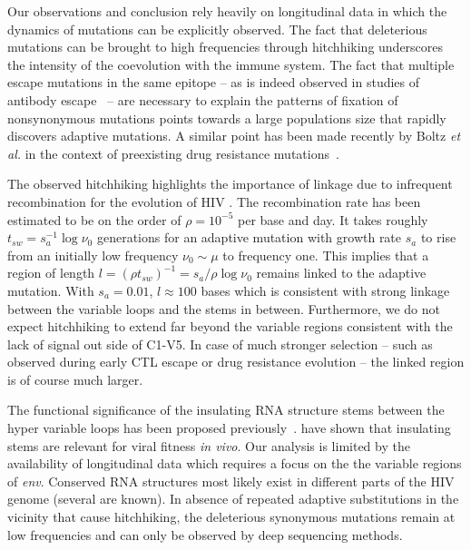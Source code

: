 \documentclass[rmp, twocolumn]{revtex4}
\newcommand{\env}{\textit{env}}
\begin{document}
Our observations and conclusion rely heavily on longitudinal data in which the
dynamics of mutations can be explicitly observed. The fact that deleterious
mutations can be brought to high frequencies through hitchhiking underscores
the intensity of the coevolution with the immune system. The fact that
multiple escape mutations in the same epitope -- as is indeed observed in
studies of antibody escape~\citep{moore_limited_2009, bar_early_2012} -- are
necessary to explain the patterns of fixation of nonsynonymous mutations points
towards a large populations size that rapidly discovers adaptive mutations. A
similar point has been made recently by Boltz {\it et al.} in the context of
preexisting drug resistance mutations~\citep{boltz_ultrasensitive_2012}. 

The observed hitchhiking highlights the importance of linkage due to infrequent
recombination for the evolution of HIV
\citep{neher_recombination_2010,batorsky_estimate_2011,
josefsson_majority_2011}. The recombination rate has been estimated to be on the
order of $\rho = 10^{-5}$ per base and day. It takes roughly $t_{sw} = s_a^{-1}
\log \nu_0$ generations for an adaptive mutation with growth rate $s_a$ to rise
from an initially low frequency $\nu_0\sim \mu$ to frequency one. This implies
that a region of length $l = (\rho t_{sw})^{-1} = s_a / \rho \log \nu_0$ remains
linked to the adaptive mutation. With $s_a=0.01$, $l\approx 100$ bases which is
consistent with strong linkage between the variable loops and the stems in
between. Furthermore, we do not expect hitchhiking to extend far beyond
the variable regions consistent with the lack of signal out side of C1-V5. In
case of much stronger selection -- such as observed during early CTL escape or
drug resistance evolution -- the linked  region is of course much larger. 

The functional significance of the insulating RNA structure stems between the
hyper variable loops has been proposed
previously~\citep{watts_architecture_2009, sanjuan_interplay_2011}.
\citet{sanjuan_interplay_2011} have shown that insulating stems are relevant for
viral fitness {\it in vivo}. Our analysis is limited by the availability of
longitudinal data which requires a focus on the the variable regions of \env.
Conserved RNA structures most likely exist in different parts
of the HIV genome (several are known). In absence of repeated adaptive substitutions in the vicinity
that cause hitchhiking, the deleterious synonymous mutations remain at low
frequencies and can only be observed by deep sequencing methods. 
\end{document}
